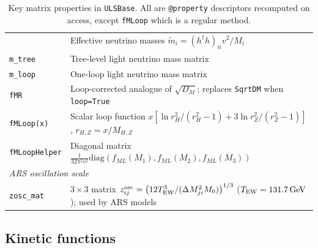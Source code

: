 \documentclass[12pt, a4paper]{article}
\begin{document}
\begin{table}[H]
\begin{tabular}{p{5.0cm} p{9.0cm}}
                      & Effective neutrino masses
                        $\tilde{m}_i=(h^\dagger h)_{ii}v^2/M_i$ \\
\texttt{m\_tree}      & Tree-level light neutrino mass matrix \\
\texttt{m\_loop}      & One-loop light neutrino mass matrix \\
\texttt{fMR}          & Loop-corrected analogue of $\sqrt{D_M}$;
                        replaces \texttt{SqrtDM} when \texttt{loop=True} \\
\texttt{fMLoop(x)}    & Scalar loop function
                        $x\!\left[\ln r_H^2/(r_H^2{-}1)+3\ln r_Z^2/(r_Z^2{-}1)\right]$,\;
                        $r_{H,Z}=x/M_{H,Z}$ \\
\texttt{fMLoopHelper} & Diagonal matrix
                        $\tfrac{1}{32\pi^2v^2}
                        \mathrm{diag}(f_{ML}(M_1),f_{ML}(M_2),f_{ML}(M_3))$ \\
\hline
\multicolumn{2}{l}{\textit{ARS oscillation scale}} \\
\texttt{zosc\_mat} & $3\times3$ matrix
                    $z_{ij}^{\rm osc}=\bigl(12T_{\rm EW}^3/(\Delta M^2_{ji}M_0)\bigr)^{1/3}$
                    ($T_{\rm EW}=131.7\,\mathrm{GeV}$); used by ARS models \\
\hline
\end{tabular}
\caption{Key matrix properties in \texttt{ULSBase}. All are \texttt{@property} descriptors
recomputed on access, except \texttt{fMLoop} which is a regular method.}
\label{tab:ulsbase_matrices}
\end{table}

\subsection*{Kinetic functions}
\end{document}
